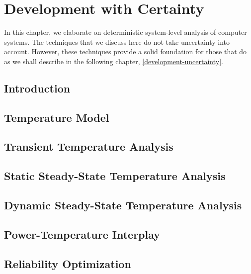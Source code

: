 \chapter{Development with Certainty}

In this chapter, we elaborate on deterministic system-level analysis of computer
systems. The techniques that we discuss here do not take uncertainty into
account. However, these techniques provide a solid foundation for those that do
as we shall describe in the following chapter, \cref{development-uncertainty}.

\section{Introduction}


\section{Temperature Model}


\section{Transient Temperature Analysis}


\section{Static Steady-State Temperature Analysis}


\section{Dynamic Steady-State Temperature Analysis}


\section{Power-Temperature Interplay}


\section{Reliability Optimization}


